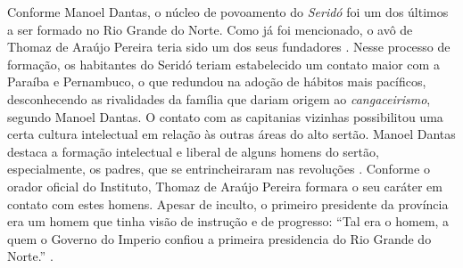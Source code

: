 \begin{refsection}
    Conforme Manoel Dantas, o núcleo de povoamento do \textit{Seridó} foi um dos últimos a ser formado no Rio Grande do Norte. Como já foi mencionado, o avô de Thomaz de Araújo Pereira teria sido um dos seus fundadores \cite[p.~178]{DiscursoManoealDantas}. Nesse processo de formação, os habitantes do Seridó teriam estabelecido um contato maior com a Paraíba e Pernambuco, o que redundou na adoção de hábitos mais pacíficos, desconhecendo as rivalidades da família que dariam origem ao \textit{cangaceirismo}, segundo Manoel Dantas. O contato com as capitanias vizinhas possibilitou uma certa cultura intelectual em relação às outras áreas do alto sertão. Manoel Dantas destaca a formação intelectual e liberal de alguns homens do sertão, especialmente, os padres, que se entrincheiraram nas revoluções \cite[p.~182]{DiscursoManoealDantas}. Conforme o orador oficial do Instituto, Thomaz de Araújo Pereira formara o seu caráter em contato com estes homens. Apesar de inculto, o primeiro presidente da província era um homem que tinha visão de instrução e de progresso: ``Tal era o homem, a quem o Governo do Imperio confiou a primeira presidencia do Rio Grande do Norte.'' \cite[p.~182]{DiscursoManoealDantas}.


\end{refsection}
